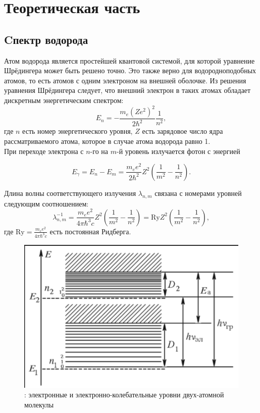 \section{Теоретическая часть}

        \subsection{Cпектр водорода}
        
        Атом водорода является простейшей квантовой системой, для которой уравнение Шрёдингера может быть решено точно. Это также верно для водородноподобных атомов, то есть атомов с одним электроном на внешней оболочке. Из решения уравнения Шрёдингера следует, что внешний электрон в таких атомах обладает дискретным энергетическим спектром:  
        \begin{equation}
            E_n = - \frac{m_e (Z e^2)^2}{2\hbar^2}\frac{1}{n^2},
        \end{equation}
        где $n$ есть номер энергетического уровня, $Z$ есть зарядовое число ядра рассматриваемого атома, которое в случае атома водорода равно 1.\\
        При переходе электрона с $n$-го на $m$-й уровень излучается фотон с энергией
        
		\begin{equation}
            E_\gamma = E_n - E_m = \frac{m_ee^2}{2\hbar^2}Z^2\left(\frac{1}{m^2} - \frac{1}{n^2}\right).
        \end{equation}
        
		Длина волны  соответствующего излучения $\lambda_{n,m}$ связана с номерами уровней следующим соотношением:
        \begin{equation}
            \label{eq:Ry}
            \lambda_{n,m}^{-1} =\frac{m_ee^2}{4\pi\hbar^3c}Z^2\left(\frac{1}{m^2}-\frac{1}{n^2}\right) = \text{Ry} Z^2 \left(\frac{1}{m^2}-\frac{1}{n^2}\right),
        \end{equation}
        где $\text{Ry} = \frac{m_ee^2}{4\pi\hbar^3c}$ есть постоянная Ридберга.

		\begin{figure}[h!]
            \centering
            \includegraphics[width=0.6\linewidth]{pics/theory.png}
            \caption{ : электронные и электронно-колебательные уровни двух-атомной молекулы}
            \label{theor}
        \end{figure}

